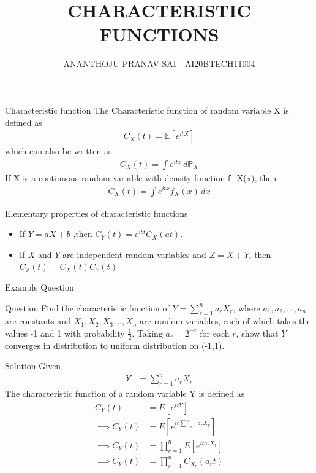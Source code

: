 \documentclass{beamer}
\title{CHARACTERISTIC FUNCTIONS}
\author{ANANTHOJU PRANAV SAI - AI20BTECH11004}
\providecommand{\brak}[1]{\ensuremath{\left(#1\right)}}
\begin{document}
\begin{frame}
\titlepage
\end{frame}
\begin{frame}{Characteristic function}
The Characteristic function of random variable X is defined as
\begin{align}
    C_{X}(t)=\mathbb{E}[e^{itX}]
\end{align}
which can also be written as
\begin{align}
    C_{X}(t)=\int e^{itx} \,d\mathbb{P}_X
\end{align}
If X is a continuous random variable with density function f_{X}(x), then\\
\begin{align} 
    C_{X}(t)=\int e^{itx}f_{X}(x)\,dx
\end{align}
\end{frame}
\begin{frame}{Elementary properties of characteristic functions}
 \begin{itemize}
     \item If $Y=aX+b$ ,then $C_Y(t) =e^{ibt}C_X(at)$.
     \item If $X$ and $Y$ are independent random variables and $Z=X+Y$, then $C_Z(t) =C_X(t)C_Y(t)$
 \end{itemize}   
\end{frame}
\begin{frame}{Example Question}
\begin{block}{Question}
    Find the characteristic function of $Y=\sum_{r=1}^{n}a_rX_r$, where $a_1,a_2,...,a_n$ are constants and $X_1,X_2,X_3,..,X_n$ are random variables, each of which takes the values -1 and 1 with probability $\frac{1}{2}$. Taking $a_r=2^{-r}$ for each $r$, show that $Y$ converges in distribution to uniform distribution on (-1,1).
\end{block}
\end{frame}
\begin{frame}{Solution}
Given,
\begin{align}
    Y&=\sum_{r=1}^{n}a_rX_r
\end{align}
The characteristic function of a random variable Y is defined as
\begin{align}
    C_{Y}\brak{t}&=E[e^{itY}]\\
    \implies C_{Y}(t)&=E[e^{it\sum_{r=1}^{n}a_rX_r}]\\
    \implies C_{Y}(t)&=\prod_{r=1}^{n}E[e^{ita_rX_r}]\\
    \implies C_{Y}(t)&=\prod_{r=1}^{n}C_{X_r}(a_rt)
\end{align}
\end{frame}
\end{document}
